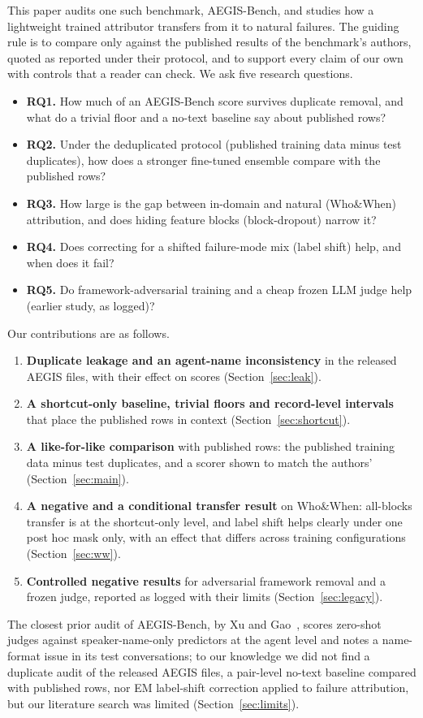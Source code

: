 \documentclass[conference]{IEEEtran}
\begin{document}
This paper audits one such benchmark, AEGIS-Bench, and studies how a lightweight trained attributor transfers from it to natural failures. The guiding rule is to compare only against the published results of the benchmark's authors, quoted as reported under their protocol, and to support every claim of our own with controls that a reader can check. We ask five research questions.
\begin{itemize}
\item \textbf{RQ1.} How much of an AEGIS-Bench score survives duplicate removal, and what do a trivial floor and a no-text baseline say about published rows?
\item \textbf{RQ2.} Under the deduplicated protocol (published training data minus test duplicates), how does a stronger fine-tuned ensemble compare with the published rows?
\item \textbf{RQ3.} How large is the gap between in-domain and natural (Who\&When) attribution, and does hiding feature blocks (block-dropout) narrow it?
\item \textbf{RQ4.} Does correcting for a shifted failure-mode mix (label shift) help, and when does it fail?
\item \textbf{RQ5.} Do framework-adversarial training and a cheap frozen LLM judge help (earlier study, as logged)?
\end{itemize}
Our contributions are as follows.
\begin{enumerate}
\item \textbf{Duplicate leakage and an agent-name inconsistency} in the released AEGIS files, with their effect on scores (Section~\ref{sec:leak}).
\item \textbf{A shortcut-only baseline, trivial floors and record-level intervals} that place the published rows in context (Section~\ref{sec:shortcut}).
\item \textbf{A like-for-like comparison} with published rows: the published training data minus test duplicates, and a scorer shown to match the authors' (Section~\ref{sec:main}).
\item \textbf{A negative and a conditional transfer result} on Who\&When: all-blocks transfer is at the shortcut-only level, and label shift helps clearly under one post hoc mask only, with an effect that differs across training configurations (Section~\ref{sec:ww}).
\item \textbf{Controlled negative results} for adversarial framework removal and a frozen judge, reported as logged with their limits (Section~\ref{sec:legacy}).
\end{enumerate}
The closest prior audit of AEGIS-Bench, by Xu and Gao~\cite{audit2}, scores zero-shot judges against speaker-name-only predictors at the agent level and notes a name-format issue in its test conversations; to our knowledge we did not find a duplicate audit of the released AEGIS files, a pair-level no-text baseline compared with published rows, nor EM label-shift correction applied to failure attribution, but our literature search was limited (Section~\ref{sec:limits}).
\end{document}
